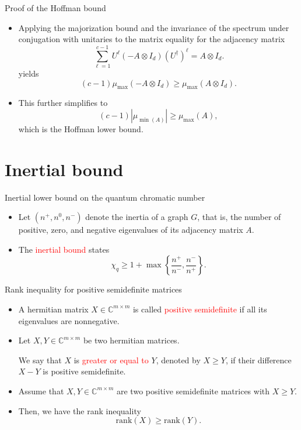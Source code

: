 \documentclass{beamer}
\newcommand{\C}{\mathbb{C}}
\renewcommand{\>}{\rangle}
\newcommand{\<}{\langle}
\begin{document}
%

\begin{frame}{Proof of the Hoffman bound}
\begin{itemize}
\item Applying the majorization bound and the invariance of the spectrum under conjugation with unitaries to the 
matrix equality for the adjacency matrix
\[
\sum_{\ell=1}^{c-1} U^\ell (-A\otimes I_d) (U^\dagger)^\ell = A \otimes I_d.
\]
yields 
\[
(c-1) \mu_{\max}(-A \otimes I_d) \ge \mu_{\max}(A\otimes I_d).
\]
\item This further simplifies to
\[
(c-1) |\mu_{\min(A)}| \ge \mu_{\max}(A),
\]
which is the Hoffman lower bound.
\end{itemize}
\end{frame}

%

\section{Inertial bound}

\begin{frame}{Inertial lower bound on the quantum chromatic number}

\begin{itemize}
\item Let $(n^+, n^0, n^-)$ denote the inertia of a graph $G$, that is, the number of positive, zero, and negative eigenvalues of its adjacency matrix $A$.

\item The \textcolor{red}{inertial bound} states
\[
\chi_q \ge 1 + \max \left\{ \frac{n^+}{n^-}, \frac{n^-}{n^+} \right\}.
\]
\end{itemize}

\end{frame}

%

\begin{frame}{Rank inequality for positive semidefinite matrices}
\begin{itemize}
\item A hermitian matrix $X\in\C^{m\times m}$ is called \textcolor{red}{positive semidefinite} if all its eigenvalues are nonnegative.

\item Let $X,Y\in\C^{m\times m}$ be two hermitian matrices. 

We say that $X$ is \textcolor{red}{greater or equal to} $Y$, denoted by $X\ge Y$, if their difference $X-Y$ is positive semidefinite.

\medskip
\item Assume that $X,Y\in\C^{m\times m}$ are two positive semidefinite matrices with $X\ge Y$.

\item Then, we have the rank inequality
\[
\mathrm{rank}(X) \ge \mathrm{rank}(Y).
\]
\end{itemize}
\end{frame}
\end{document}
